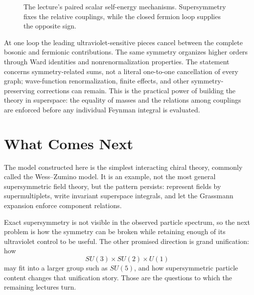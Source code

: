 \begin{figure}[H]
\centering
{}
\caption{The lecture's paired scalar self-energy mechanisms. Supersymmetry fixes the relative couplings, while the closed fermion loop supplies the opposite sign.}
\end{figure}

At one loop the leading ultraviolet-sensitive pieces cancel between the complete bosonic and fermionic contributions. The same symmetry organizes higher orders through Ward identities and nonrenormalization properties. The statement concerns symmetry-related sums, not a literal one-to-one cancellation of every graph; wave-function renormalization, finite effects, and other symmetry-preserving corrections can remain. This is the practical power of building the theory in superspace: the equality of masses and the relations among couplings are enforced before any individual Feynman integral is evaluated.

\section{What Comes Next}

The model constructed here is the simplest interacting chiral theory, commonly called the Wess--Zumino model. It is an example, not the most general supersymmetric field theory, but the pattern persists: represent fields by supermultiplets, write invariant superspace integrals, and let the Grassmann expansion enforce component relations.

Exact supersymmetry is not visible in the observed particle spectrum, so the next problem is how the symmetry can be broken while retaining enough of its ultraviolet control to be useful. The other promised direction is grand unification: how
\begin{equation}
SU(3)\times SU(2)\times U(1)
\end{equation}
may fit into a larger group such as \(SU(5)\), and how supersymmetric particle content changes that unification story. Those are the questions to which the remaining lectures turn.
